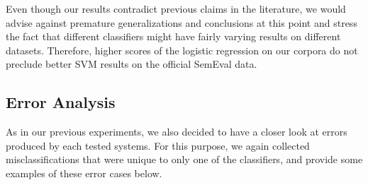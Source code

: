 Even though our results contradict previous claims in the literature,
we would advise against premature generalizations and conclusions at
this point and stress the fact that different classifiers might have
fairly varying results on different datasets.  Therefore, higher
scores of the logistic regression on our corpora do not preclude
better SVM results on the official SemEval data.

\subsection{Error Analysis}\label{subsec:cgsa:ml-methods:err-analysis}

As in our previous experiments, we also decided to have a closer look
at errors produced by each tested systems.  For this purpose, we again
collected misclassifications that were unique to only one of the
classifiers, and provide some examples of these error cases below.

